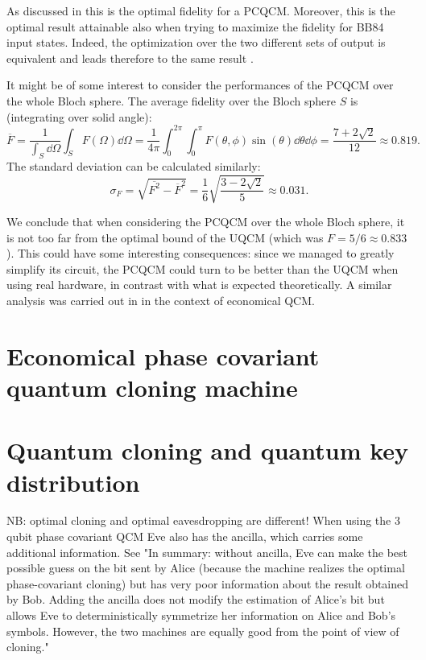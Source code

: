 As discussed in \cite{PhaseCovariantOptimalBruss} this is the optimal fidelity for a PCQCM. 
Moreover, this is the optimal result attainable also when trying to maximize the fidelity for BB84 input states.
Indeed, the optimization over the two different sets of output is equivalent and leads therefore to the same result \cite{PhaseCovariantOptimalBruss}.

It might be of some interest to consider the performances of the PCQCM over the whole Bloch sphere.
The average fidelity over the Bloch sphere $S$ is (integrating over solid angle):
\[
    \overline{F}=\frac{1}{\int_S \dd{\Omega}}\int_S F(\Omega)\dd{\Omega}=\frac{1}{4\pi}\int_0^{2\pi}\int_0^\pi F(\theta,\phi)\sin(\theta)\dd{\theta}\dd{\phi}=\frac{7+2\sqrt{2}}{12}\approx 0.819.
\]
The standard deviation can be calculated similarly:
\[
    \sigma_{F}=\sqrt{\overline{F^2}-\overline{F}^2}=\frac{1}{6}\sqrt{\frac{3-2\sqrt{2}}{5}}\approx0.031.
\]

We conclude that when considering the PCQCM over the whole Bloch sphere, it is not too far from the optimal bound of the UQCM (which was $F=5/6\approx 0.833$).
This could have some interesting consequences: since we managed to greatly simplify its circuit, the PCQCM could turn to be better than the UQCM when using real hardware, in contrast with what is expected theoretically.
A similar analysis was carried out in \cite{LowCostCloning} in the context of economical QCM.
\section{Economical phase covariant quantum cloning machine}
\section{Quantum cloning and quantum key distribution}

NB: optimal cloning and optimal eavesdropping are different!
When using the 3 qubit phase covariant QCM Eve also has the ancilla, which carries some additional information. See \cite{QuantumCloningReviewScarani}
"In summary: without ancilla, Eve can make the best possible guess on the bit sent by Alice (because the machine realizes the optimal phase-covariant cloning) but has very poor information about the result obtained by Bob. 
Adding the ancilla does not modify the estimation of Alice’s bit but allows Eve to deterministically symmetrize her information on Alice and Bob’s symbols. 
However, the two machines are equally good from the point of view of cloning."